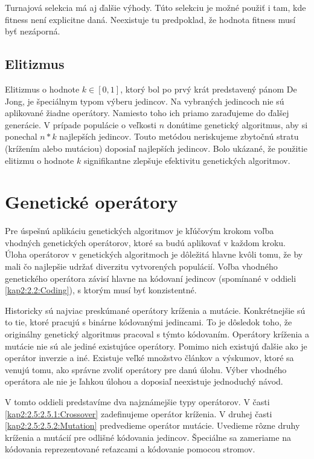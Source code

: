 Turnajová selekcia má aj ďalšie výhody.
Túto selekciu je možné použiť i tam, kde fitness není explicitne daná. Neexistuje tu predpoklad, že hodnota fitness musí byť nezáporná.

\subsection{Elitizmus}\label{kap2:2.4:2.4.3:Elitism}
Elitizmus o hodnote $k\in[0,1]$, ktorý bol po prvý krát predstavený pánom De Jong, je špeciálnym typom výberu jedincov. Na vybraných jedincoch nie sú aplikované žiadne operátory. Namiesto toho ich priamo zaraďujeme do ďalšej generácie. V prípade populácie o veľkosti $n$ donútime genetický algoritmus, aby si ponechal $n*k$ najlepších jedincov. Touto metódou neriskujeme zbytočnú stratu (krížením alebo mutáciou) doposiaľ najlepších jedincov. Bolo ukázané, že použitie elitizmu o hodnote $k$ signifikantne zlepšuje efektivitu genetických algoritmov.

\section{Genetické operátory}\label{kap2:2.5:Operators}
Pre úspešnú aplikáciu genetických algoritmov je kľúčovým krokom voľba vhodných genetických operátorov, ktoré sa budú aplikovať v každom kroku. Úloha operátorov v genetických algoritmoch je dôležitá hlavne kvôli tomu, že by mali čo najlepšie udržať diverzitu vytvorených populácií. Voľba vhodného genetického operátora závisí hlavne na kódovaní jedincov (spomínané v oddieli \ref{kap2:2.2:Coding}), s ktorým musí byť konzistentné.

Historicky sú najviac preskúmané operátory kríženia a mutácie. Konkrétnejšie sú to tie, ktoré pracujú s binárne kódovanými jedincami. To je dôsledok toho, že originálny genetický algoritmus pracoval s týmto kódovaním. Operátory kríženia a mutácie nie sú ale jediné existujúce operátory. Pomimo nich existujú ďalšie ako je operátor inverzie a iné.
Existuje veľké množstvo článkov a výskumov, ktoré sa venujú tomu, ako správne zvoliť operátory pre danú úlohu. Výber vhodného operátora ale nie je ľahkou úlohou a doposiaľ neexistuje jednoduchý návod.

V tomto oddieli predstavíme dva najznámejšie typy operátorov. V časti \ref{kap2:2.5:2.5.1:Crossover} zadefinujeme operátor kríženia. V druhej časti \ref{kap2:2.5:2.5.2:Mutation} predvedieme operátor mutácie. Uvedieme rôzne druhy kríženia a mutácií pre odlišné kódovania jedincov. Špeciálne sa zameriame na kódovania reprezentované reťazcami a kódovanie pomocou stromov.
